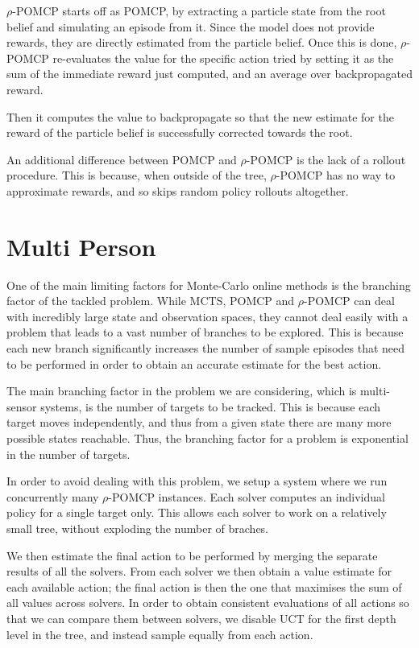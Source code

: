 $\rho$-POMCP starts off as POMCP, by extracting a particle state from the root belief and simulating
an episode from it. Since the model does not provide rewards, they are directly estimated from the
particle belief. Once this is done, $\rho$-POMCP re-evaluates the value for the specific action
tried by setting it as the sum of the immediate reward just computed, and an average over
backpropagated reward.

Then it computes the value to backpropagate so that the new estimate for the reward of the particle
belief is successfully corrected towards the root.

An additional difference between POMCP and $\rho$-POMCP is the lack of a rollout procedure. This is
because, when outside of the tree, $\rho$-POMCP has no way to approximate rewards, and so skips
random policy rollouts altogether.

\section{Multi Person}

One of the main limiting factors for Monte-Carlo online methods is the branching factor of the
tackled problem. While MCTS, POMCP and $\rho$-POMCP can deal with incredibly large state and
observation spaces, they cannot deal easily with a problem that leads to a vast number of branches
to be explored. This is because each new branch significantly increases the number of sample
episodes that need to be performed in order to obtain an accurate estimate for the best action.

The main branching factor in the problem we are considering, which is multi-sensor systems, is the
number of targets to be tracked. This is because each target moves independently, and thus from a
given state there are many more possible states reachable. Thus, the branching factor for a problem
is exponential in the number of targets.

In order to avoid dealing with this problem, we setup a system where we run concurrently many
$\rho$-POMCP instances. Each solver computes an individual policy for a single target only. This
allows each solver to work on a relatively small tree, without exploding the number of braches.

We then estimate the final action to be performed by merging the separate results of all the
solvers.  From each solver we then obtain a value estimate for each available action; the final
action is then the one that maximises the sum of all values across solvers. In order to obtain
consistent evaluations of all actions so that we can compare them between solvers, we disable UCT
for the first depth level in the tree, and instead sample equally from each action.
